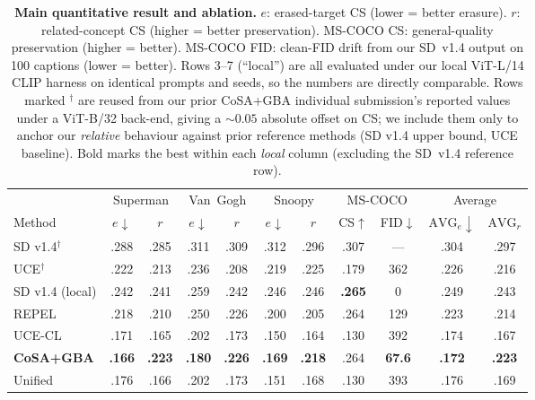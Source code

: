 \documentclass[10pt,twocolumn,letterpaper]{article}
\begin{document}
\begin{table}[t]
\centering\small
\setlength{\tabcolsep}{5pt}
\begin{tabular}{lcccccccccc}
\toprule
 & \multicolumn{2}{c}{Superman} & \multicolumn{2}{c}{Van~Gogh}
 & \multicolumn{2}{c}{Snoopy} & \multicolumn{2}{c}{MS-COCO}
 & \multicolumn{2}{c}{Average} \\
\cmidrule(lr){2-3}\cmidrule(lr){4-5}\cmidrule(lr){6-7}\cmidrule(lr){8-9}\cmidrule(lr){10-11}
Method & $e{\downarrow}$ & $r$ & $e{\downarrow}$ & $r$
& $e{\downarrow}$ & $r$ & CS$\uparrow$ & FID$\downarrow$
& $\text{AVG}_e\!\downarrow$ & $\text{AVG}_r$ \\
\midrule
SD v1.4$^\dagger$ & .288 & .285 & .311 & .309 & .312 & .296 & .307 & --- & .304 & .297 \\
UCE$^\dagger$     & .222 & .213 & .236 & .208 & .219 & .225 & .179 & 362 & .226 & .216 \\
\midrule
SD v1.4 (local) & .242 & .241 & .259 & .242 & .246 & .246 & \textbf{.265} & 0 & .249 & .243 \\
REPEL           & .218 & .210 & .250 & .226 & .200 & .205 & .264 & 129 & .223 & .214 \\
UCE-CL          & .171 & .165 & .202 & .173 & .150 & .164 & .130 & 392 & .174 & .167 \\
\textbf{CoSA+GBA} & \textbf{.166} & \textbf{.223} & \textbf{.180} & \textbf{.226} & \textbf{.169} & \textbf{.218} & .264 & \textbf{67.6} & \textbf{.172} & \textbf{.223} \\
Unified         & .176 & .166 & .202 & .173 & .151 & .168 & .130 & 393 & .176 & .169 \\
\bottomrule
\end{tabular}
\caption{\textbf{Main quantitative result and ablation.}
$e$: erased-target CS (lower = better erasure).
$r$: related-concept CS (higher = better preservation).
MS-COCO CS: general-quality preservation (higher = better).
MS-COCO FID: clean-FID drift from our SD~v1.4 output on 100 captions
(lower = better).
Rows 3--7 (``local'') are all evaluated under our local ViT-L/14 CLIP
harness on identical prompts and seeds, so the numbers are directly
comparable. Rows marked $^\dagger$ are reused from our prior CoSA+GBA
individual submission's reported values under a ViT-B/32 back-end,
giving a $\sim\!0.05$ absolute offset on CS; we include them only to
anchor our \emph{relative} behaviour against prior reference methods
(SD v1.4 upper bound, UCE baseline). Bold marks the best within each
\emph{local} column (excluding the SD~v1.4 reference row).}
\label{tab:main}
\end{table}
\end{document}
